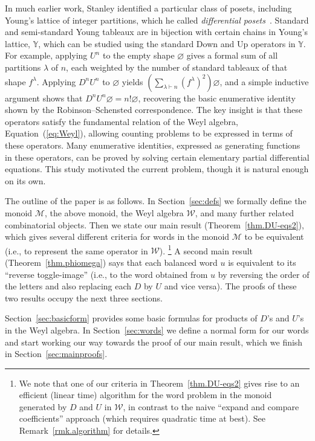 \documentclass[numbers=enddot,12pt,final,onecolumn,notitlepage]{scrartcl}%
\theoremstyle{definition}
\newcommand{\W}{\mathcal{W}}
\newcommand{\M}{\mathcal{M}}
\begin{document}
In much earlier work, Stanley identified a particular class of posets, including Young's
lattice of integer partitions, which he called \emph{differential
posets}~\cite{Stan88DiffPos}.  Standard and semi-standard Young tableaux are in bijection
with certain chains in Young's lattice, $\mathbb{Y}$, which can be studied using the
standard Down and Up operators in $\mathbb{Y}$. For example, applying $U^{n}$ to the empty
shape $\varnothing$ gives a formal sum of all partitions $\lambda$ of $n$, each weighted by
the number of standard tableaux of that shape $f^{\lambda}$.  Applying $D^{n}U^{n}$ to
$\varnothing$ yields $\left(\sum_{\lambda \vdash n} (f^{\lambda})^{2}\right) \varnothing$, and a
simple inductive argument shows that $D^nU^n\varnothing = n!\varnothing$, recovering the basic
enumerative identity shown by the Robinson--Schensted correspondence. The key insight is
that these operators satisfy the fundamental relation of the Weyl algebra,
Equation~(\ref{eq:Weyl}), allowing counting problems to be expressed in terms of these operators.
Many enumerative identities, expressed as generating functions in these operators, can be
proved by solving certain elementary partial differential equations. This study motivated
the current problem, though it is natural enough on its own.  

The outline of the paper is as follows.
In Section~\ref{sec:defs} we formally define the monoid $\M$, the above monoid, the Weyl algebra $\W$, and many further related combinatorial objects.
Then we state our main result (Theorem~\ref{thm.DU-eqs2}), which gives several different criteria for words
in the monoid $\M$ to be equivalent (i.e., to represent the same operator in $\W$).
\footnote{We note that one of our criteria in Theorem~\ref{thm.DU-eqs2} gives rise to an efficient (linear time) algorithm for the word problem in the monoid generated by $D$ and $U$ in $\W$, in contrast to the naive ``expand and compare coefficients'' approach (which requires quadratic time at best). See Remark~\ref{rmk.algorithm} for details.}
A second main result (Theorem~\ref{thm.phiomega}) says that each balanced word $u$ is equivalent to its ``reverse toggle-image'' (i.e., to the word obtained from $u$ by reversing the order of the letters and also replacing each $D$ by $U$ and vice versa).
The proofs of these two results occupy the next three sections.

Section~\ref{sec:basicform} provides some basic formulas for products of $D$'s and $U$'s in the Weyl algebra.  In Section~\ref{sec:words} we define a normal form for
our words and start working our way towards the proof of our main result, which we finish
in Section~\ref{sec:mainproofs}. 
\end{document}
